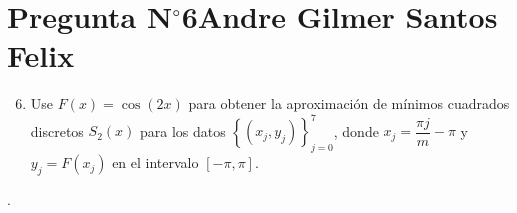 \section{Pregunta N$^{\circ}$6\qquad Andre Gilmer Santos Felix}

\begin{frame}
    \begin{enumerate}\setcounter{enumi}{5}
        \item

              Use
              \begin{math}
                  F\left(x\right)=
                  \cos\left(2x\right)
              \end{math}
              para obtener la aproximación de mínimos cuadrados
              discretos
              \begin{math}
                  S_{2}\left(x\right)
              \end{math}
              para los datos
              \begin{math}
                  \left\{
                  \left(x_{j},y_{j}\right)
                  \right\}_{j=0}^{7}
              \end{math},
              donde
              \begin{math}
                  x_{j}=
                  \dfrac{\pi j}{m}-
                  \pi
              \end{math}
              y
              \begin{math}
                  y_{j}=
                  F\left(x_{j}\right)
              \end{math}
              en el intervalo
              \begin{math}
                  \left[
                      -\pi,
                      \pi
                      \right]
              \end{math}.
    \end{enumerate}

    \begin{solution}
        .
    \end{solution}
\end{frame}